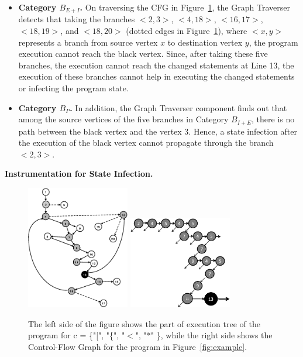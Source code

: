 \begin{itemize}
\item \textbf{Category $B_{E+I}$.} On traversing the CFG in Figure~\ref{fig:Tree}, the Graph Traverser detects that taking the branches $<2, 3>$, $<4, 18>$, $<16, 17>$, $<18, 19>$, and $<18, 20>$ (dotted edges in Figure~\ref{fig:Tree}), where $<x,y>$ represents a branch from source vertex $x$ to destination vertex $y$, the program execution cannot reach the black vertex. Since, after taking these five branches, the execution cannot reach the changed statements at Line 13, the execution of these branches cannot help in executing the changed statements or infecting the program state. \\ 
\item \textbf{Category $B_{P}$.} In addition, the Graph Traverser component finds out that 
among the source vertices of the five branches in Category $B_{I+E}$, there is no path between the 
black vertex and the vertex 3. Hence, a state infection after the execution of the black vertex 
cannot propagate through the branch $<2,3>$.
\end{itemize}
\textbf{Instrumentation for State Infection.}
\begin{figure}[t]
    \centering
         \includegraphics[width=4.5cm, keepaspectratio]{Figures/cfg3}
         \hspace{2cm}
         \includegraphics[width=4.5cm, keepaspectratio]{Figures/ExecutionTreeEPS}
    \vspace{-0.2cm}
    \caption{\scriptsize{The left side of the figure shows the part of execution tree of the program for c = \{"[", "\{", "$<$", "*" \}, while the right side shows the Control-Flow Graph for the program in Figure~\ref{fig:example}.}}
    \vspace{-1cm}
    \label{fig:Tree}
    \end{figure}
